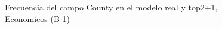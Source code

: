 \begin{figure}[H]
    \centering
    
    \caption{Frecuencia del campo County en el modelo real y top2+1, Economicos (B-1)}
    \label{frecuency-County-top2+1}
\end{figure}